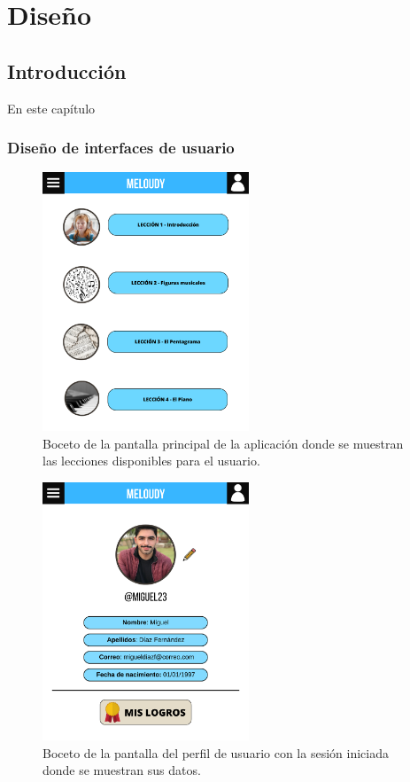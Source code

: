 \chapter{Diseño}

\section{Introducción}
En este capítulo 

\subsection{Diseño de interfaces de usuario}


\begin{figure}[H]
    \centering
    \centerline{\includegraphics[width=0.55\textwidth, frame]{imagenes/c6/1.png}}
    \caption{Boceto de la pantalla principal de la aplicación donde se muestran las lecciones disponibles para el usuario.}
    \label{fig:pantallaprincipal}
    
    
\end{figure}

\begin{figure}[H]
    \centering
    \centerline{\includegraphics[width=0.55\textwidth, frame]{imagenes/c6/2.png}}
    \caption{Boceto de la pantalla del perfil de usuario con la sesión iniciada donde se muestran sus datos.}
    \label{fig:perfil}
    
    
\end{figure}


